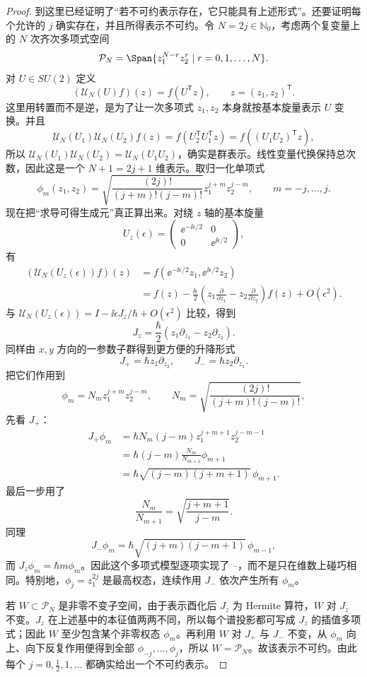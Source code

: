 \begin{proof}
到这里已经证明了“若不可约表示存在，它只能具有上述形式”。还要证明每个允许的 $j$ 确实存在，并且所得表示不可约。令 $N=2j\in\mathbb N_0$，考虑两个复变量上的 $N$ 次齐次多项式空间
\[
\mathcal P_N
=\Span\{z_1^{N-r}z_2^r\mid r=0,1,\dots,N\}.
\]
对 $U\in SU(2)$ 定义
\[
(\mathcal U_N(U)f)(z)=f(U^{\mathsf T}z),
\qquad z=(z_1,z_2)^{\mathsf T}.
\]
这里用转置而不是逆，是为了让一次多项式 $z_1,z_2$ 本身就按基本旋量表示 $U$ 变换。并且
\[
\mathcal U_N(U_1)\mathcal U_N(U_2)f(z)
=f(U_2^{\mathsf T}U_1^{\mathsf T}z)
=f((U_1U_2)^{\mathsf T}z),
\]
所以 $\mathcal U_N(U_1)\mathcal U_N(U_2)=\mathcal U_N(U_1U_2)$，确实是群表示。线性变量代换保持总次数，因此这是一个 $N+1=2j+1$ 维表示。取归一化单项式
\[
\phi_m(z_1,z_2)
=\sqrt{\frac{(2j)!}{(j+m)!(j-m)!}}
 z_1^{j+m}z_2^{j-m},
\qquad m=-j,\dots,j.
\]
现在把“求导可得生成元”真正算出来。对绕 $z$ 轴的基本旋量
\[
U_z(\epsilon)=
\begin{pmatrix}
\ee^{-\ii\epsilon/2}&0\\0&\ee^{\ii\epsilon/2}
\end{pmatrix},
\]
有
\begin{align*}
(\mathcal U_N(U_z(\epsilon))f)(z)
&=f(\ee^{-\ii\epsilon/2}z_1,
     \ee^{\ii\epsilon/2}z_2)\\
&=f(z)-\frac{\ii\epsilon}{2}
\left(z_1\frac{\partial}{\partial z_1}
-z_2\frac{\partial}{\partial z_2}\right)f(z)
+O(\epsilon^2).
\end{align*}
与 $\mathcal U_N(U_z(\epsilon))=I-\ii\epsilon J_z/\hbar+O(\epsilon^2)$ 比较，得到
\[
J_z=\frac{\hbar}{2}
\left(z_1\partial_{z_1}-z_2\partial_{z_2}\right).
\]
同样由 $x,y$ 方向的一参数子群得到更方便的升降形式
\[
J_+=\hbar z_1\partial_{z_2},
\qquad
J_-=\hbar z_2\partial_{z_1}.
\]
把它们作用到
\[
\phi_m=N_m z_1^{j+m}z_2^{j-m},
\qquad
N_m=\sqrt{\frac{(2j)!}{(j+m)!(j-m)!}},
\]
先看 $J_+$：
\begin{align*}
J_+\phi_m
&=\hbar N_m(j-m)
 z_1^{j+m+1}z_2^{j-m-1}\\
&=\hbar(j-m)\frac{N_m}{N_{m+1}}\phi_{m+1}\\
&=\hbar\sqrt{(j-m)(j+m+1)}\,\phi_{m+1}.
\end{align*}
最后一步用了
\[
\frac{N_m}{N_{m+1}}
=\sqrt{\frac{j+m+1}{j-m}}.
\]
同理
\[
J_-\phi_m
=\hbar\sqrt{(j+m)(j-m+1)}\,\phi_{m-1},
\]
而 $J_z\phi_m=\hbar m\phi_m$。因此这个多项式模型逐项实现了 --，而不是只在维数上碰巧相同。特别地，$\phi_j=z_1^{2j}$ 是最高权态，连续作用 $J_-$ 依次产生所有 $\phi_m$。

若 $W\subset\mathcal P_N$ 是非零不变子空间，由于表示酉化后 $J_z$ 为 Hermite 算符，$W$ 对 $J_z$ 不变。$J_z$ 在上述基中的本征值两两不同，所以每个谱投影都可写成 $J_z$ 的插值多项式；因此 $W$ 至少包含某个非零权态 $\phi_m$。再利用 $W$ 对 $J_+$ 与 $J_-$ 不变，从 $\phi_m$ 向上、向下反复作用便得到全部 $\phi_{-j},\dots,\phi_j$，所以 $W=\mathcal P_N$。故该表示不可约。由此每个 $j=0,\frac12,1,\dots$ 都确实给出一个不可约表示。


\end{proof}
